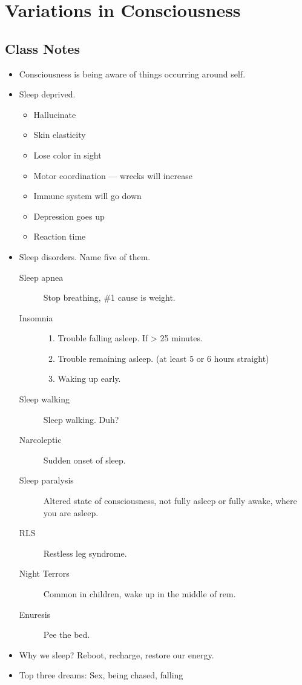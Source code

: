 \documentclass{article}
\begin{document}
\section{Variations in Consciousness}
\subsection{Class Notes}
\begin{itemize}
    \item Consciousness is being aware of things occurring around self.
    \item Sleep deprived.
    \begin{itemize}
        \item Hallucinate
        \item Skin elasticity
        \item Lose color in sight
        \item Motor coordination --- wrecks will increase
        \item Immune system will go down
        \item Depression goes up
        \item Reaction time

    \end{itemize}

    \item Sleep disorders. Name five of them.
    \begin{description}
        \item [Sleep apnea] Stop breathing, \#1 cause is weight.
        \item [Insomnia]
        \begin{enumerate}
            \item Trouble falling asleep. If > 25 minutes.
            \item Trouble remaining asleep. (at least 5 or 6 hours straight)
            \item Waking up early.
        \end{enumerate}

        \item [Sleep walking] Sleep walking. Duh?
        \item [Narcoleptic] Sudden onset of sleep.
        \item [Sleep paralysis] Altered state of consciousness, not fully asleep or fully awake, where you are asleep.
        \item [RLS] Restless leg syndrome.
        \item [Night Terrors] Common in children, wake up in the middle of rem.
        \item [Enuresis] Pee the bed.
    \end{description}

    \item Why we sleep? Reboot, recharge, restore our energy.
    \item Top three dreams: Sex, being chased, falling
\end{itemize}
\end{document}
